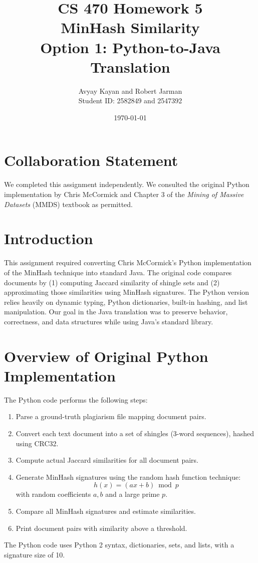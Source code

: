 \documentclass[11pt]{article}
\title{\textbf{CS 470 Homework 5 \\ MinHash Similarity \\ Option 1: Python-to-Java Translation}}
\author{Avyay Kayan and Robert Jarman \\
Student ID: 2582849 and 2547392 }
\date{\today}
\begin{document}
\maketitle

\section*{Collaboration Statement}
We completed this assignment independently. We consulted the original Python implementation by Chris McCormick and Chapter 3 of the \textit{Mining of Massive Datasets} (MMDS) textbook as permitted.

\section{Introduction}
This assignment required converting Chris McCormick's Python implementation of the MinHash technique into standard Java. The original code compares documents by (1) computing Jaccard similarity of shingle sets and (2) approximating those similarities using MinHash signatures. The Python version relies heavily on dynamic typing, Python dictionaries, built-in hashing, and list manipulation. Our goal in the Java translation was to preserve behavior, correctness, and data structures while using Java’s standard library.

\section{Overview of Original Python Implementation}
The Python code performs the following steps:
\begin{enumerate}
    \item Parse a ground-truth plagiarism file mapping document pairs.
    \item Convert each text document into a set of shingles (3-word sequences), hashed using CRC32.
    \item Compute actual Jaccard similarities for all document pairs.
    \item Generate MinHash signatures using the random hash function technique:
    \[
        h(x) = (a x + b) \bmod p
    \]
    with random coefficients $a,b$ and a large prime $p$.
    \item Compare all MinHash signatures and estimate similarities.
    \item Print document pairs with similarity above a threshold.
\end{enumerate}
The Python code uses Python 2 syntax, dictionaries, sets, and lists, with a signature size of 10.
\end{document}
